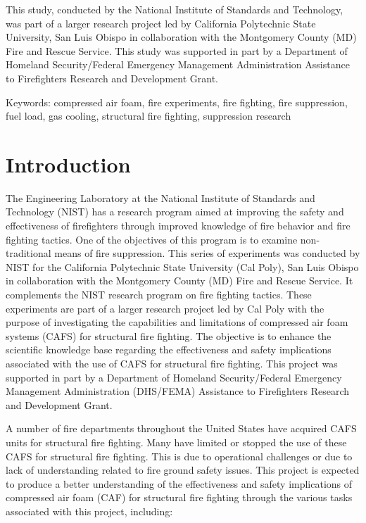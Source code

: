 \documentclass[12pt,oneside]{book}
\begin{document}
This study, conducted by the National Institute of Standards and Technology, was part of a larger research project led by California Polytechnic State University, San Luis Obispo in collaboration with the Montgomery County (MD) Fire and Rescue Service. This study was supported in part by a Department of Homeland Security/Federal Emergency Management Administration Assistance to Firefighters Research and Development Grant.

\vspace{0.5in}
Keywords: compressed air foam, fire experiments, fire fighting, fire suppression, fuel load, gas cooling, structural fire fighting, suppression research  


\chapter{Introduction}
\label{chap:Introduction}
\setcounter{page}{1}

The Engineering Laboratory at the National Institute of Standards and Technology (NIST) has a research program aimed at improving the safety and effectiveness of firefighters through improved knowledge of fire behavior and fire fighting tactics. One of the objectives of this program is to examine non-traditional means of fire suppression. This series of experiments was conducted by NIST for the California Polytechnic State University (Cal Poly), San Luis Obispo in collaboration with the Montgomery County (MD) Fire and Rescue Service. It complements the NIST research program on fire fighting tactics. These experiments are part of a larger research project led by Cal Poly with the purpose of investigating the capabilities and limitations of compressed air foam systems (CAFS) for structural fire fighting. The objective is to enhance the scientific knowledge base regarding the effectiveness and safety implications associated with the use of CAFS for structural fire fighting. This project was supported in part by a Department of Homeland Security/Federal Emergency Management Administration (DHS/FEMA) Assistance to Firefighters Research and Development Grant.

A number of fire departments throughout the United States have acquired CAFS units for structural fire fighting. Many have limited or stopped the use of these CAFS for structural fire fighting. This is due to operational challenges or due to lack of understanding related to fire ground safety issues. This project is expected to produce a better understanding of the effectiveness and safety implications of compressed air foam (CAF) for structural fire fighting through the various tasks associated with this project, including: 
\end{document}
